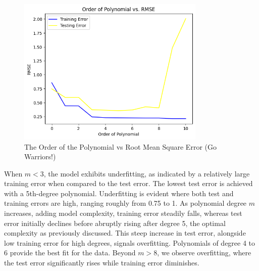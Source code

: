 \documentclass[10pt]{article}
\begin{document}
\begin{figure}[h!]
  \centering
  \includegraphics[width=0.8\textwidth]{RMSE.png}
  \caption{The Order of the Polynomial vs Root Mean Square Error (Go Warriors!)}
\end{figure}


When \( m < 3 \), the model exhibits underfitting, as indicated by a relatively large training error when compared to the test error. The lowest test error is achieved with a 5th-degree polynomial. Underfitting is evident where both test and training errors are high, ranging roughly from 0.75 to 1. As polynomial degree \( m \) increases, adding model complexity, training error steadily falls, whereas test error initially declines before abruptly rising after degree 5, the optimal complexity as previously discussed. This steep increase in test error, alongside low training error for high degrees, signals overfitting. Polynomials of degree 4 to 6 provide the best fit for the data. Beyond \( m > 8 \), we observe overfitting, where the test error significantly rises while training error diminishes.
\end{document}
